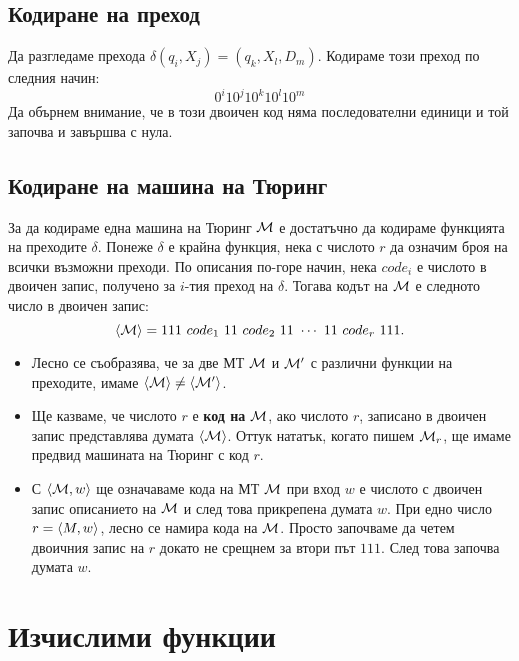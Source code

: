 \subsection*{Кодиране на преход}
Да разгледаме прехода $\delta(q_i,X_j) = (q_k,X_l,D_m)$.
Кодираме този преход по следния начин:
\[0^i10^j10^k10^l10^m\]
Да обърнем внимание, че в този двоичен код няма последователни единици и той 
започва и завършва с нула.
\subsection*{Кодиране на машина на Тюринг}
За да кодираме една машина на Тюринг $\mathcal{M}$ е достатъчно да кодираме функцията на преходите $\delta$.
Понеже $\delta$ е крайна функция, нека с числото $r$ да означим броя на всички възможни преходи.
По описания по-горе начин, нека $code_i$ е числото в двоичен запис, получено за $i$-тия преход на $\delta$.
Тогава кодът на $\mathcal{M}$ е следното число в двоичен запис:
\[\pair{\M} = 111\ code_1\ 11\ code_2\ 11\ \cdots\ 11\ code_r\ 111.\]
\begin{itemize}
\item
  Лесно се съобразява, че за две МТ $\mathcal{M}$ и $\mathcal{M}'$ с различни функции на преходите, имаме $\langle{\mathcal{M}}\rangle \neq \langle{\mathcal{M}'}\rangle$.
\item
  Ще казваме, че числото $r$ е {\bf код на } $\mathcal{M}$, ако числото $r$, записано в двоичен запис представлява думата $\langle{\mathcal{M}}\rangle$.
  Оттук нататък, когато пишем $\mathcal{M}_r$, ще имаме предвид машината на Тюринг с код $r$.
\item
  С $\langle{\mathcal{M},w}\rangle$ ще означаваме кода на МТ $\mathcal{M}$ при вход $w$ е числото с двоичен запис описанието на $\mathcal{M}$ и след това прикрепена думата $w$.
  При едно число $r = \langle{M,w}\rangle$, лесно се намира кода на $\mathcal{M}$.
  Просто започваме да четем двоичния запис на $r$ докато не срещнем за втори път $111$.
  След това започва думата $w$.
\end{itemize}


\section{Изчислими функции}

